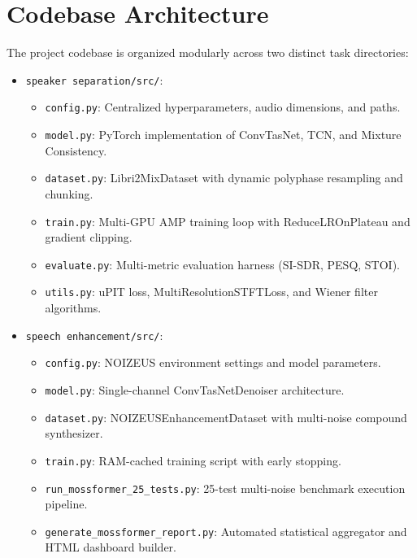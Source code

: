 \documentclass[11pt,a4paper]{report}
\begin{document}
\section{Codebase Architecture}
The project codebase is organized modularly across two distinct task directories:
\begin{itemize}
    \item \texttt{speaker separation/src/}:
    \begin{itemize}
        \item \texttt{config.py}: Centralized hyperparameters, audio dimensions, and paths.
        \item \texttt{model.py}: PyTorch implementation of ConvTasNet, TCN, and Mixture Consistency.
        \item \texttt{dataset.py}: Libri2MixDataset with dynamic polyphase resampling and chunking.
        \item \texttt{train.py}: Multi-GPU AMP training loop with ReduceLROnPlateau and gradient clipping.
        \item \texttt{evaluate.py}: Multi-metric evaluation harness (SI-SDR, PESQ, STOI).
        \item \texttt{utils.py}: uPIT loss, MultiResolutionSTFTLoss, and Wiener filter algorithms.
    \end{itemize}
    \item \texttt{speech enhancement/src/}:
    \begin{itemize}
        \item \texttt{config.py}: NOIZEUS environment settings and model parameters.
        \item \texttt{model.py}: Single-channel ConvTasNetDenoiser architecture.
        \item \texttt{dataset.py}: NOIZEUSEnhancementDataset with multi-noise compound synthesizer.
        \item \texttt{train.py}: RAM-cached training script with early stopping.
        \item \texttt{run\_mossformer\_25\_tests.py}: 25-test multi-noise benchmark execution pipeline.
        \item \texttt{generate\_mossformer\_report.py}: Automated statistical aggregator and HTML dashboard builder.
    \end{itemize}
\end{itemize}

\end{document}
